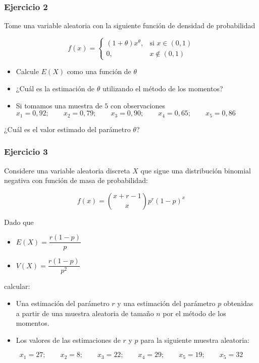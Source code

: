 \documentclass[
]{book}
\providecommand{\tightlist}{%
  \setlength{\itemsep}{0pt}\setlength{\parskip}{0pt}}
\begin{document}
\hypertarget{ejercicio-2-8}{%
\subsubsection{Ejercicio 2}\label{ejercicio-2-8}}

Tome una variable aleatoria con la siguiente función de densidad de probabilidad

\[
f(x)=
\begin{cases}
    (1+\theta)x^\theta,& \text{si } x\in (0,1)\\
    0,& x\notin (0,1)
\end{cases}
\]

\begin{itemize}
\tightlist
\item
  Calcule \(E(X)\) como una función de \(\theta\)
\item
  ¿Cuál es la estimación de \(\theta\) utilizando el método de los momentos?
\item
  Si tomamos una muestra de \(5\) con observaciones
  \(x_1 = 0,92; \qquad x_2 = 0,79; \qquad x_3 = 0,90; \qquad x_4 = 0,65; \qquad x_5 = 0,86\)
\end{itemize}

¿Cuál es el valor estimado del parámetro \(\theta\)?

\hypertarget{ejercicio-3-5}{%
\subsubsection{Ejercicio 3}\label{ejercicio-3-5}}

Considere una variable aleatoria discreta \(X\) que sigue una distribución binomial negativa con función de masa de probabilidad:

\[f(x) = \binom{x+r-1}{x}p^r(1-p)^x\]

Dado que

\begin{itemize}
\tightlist
\item
  \(E(X)=\dfrac{r(1-p)}{p}\)
\item
  \(V(X) =\dfrac{r(1-p)}{p^2}\)
\end{itemize}

calcular:

\begin{itemize}
\item
  Una estimación del parámetro \(r\) y una estimación del parámetro \(p\) obtenidas a partir de una muestra aleatoria de tamaño \(n\) por el método de los momentos.
\item
  Los valores de las estimaciones de \(r\) y \(p\) para la siguiente muestra aleatoria:
\end{itemize}

\[x_1 = 27; \qquad x_2 = 8; \qquad x_3 = 22; \qquad x_4 = 29; \qquad x_5 = 19; \qquad x_5 = 32\]

  
\end{document}
